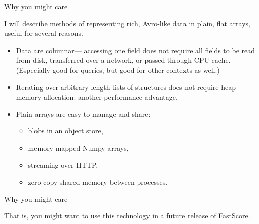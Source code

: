 \documentclass{beamer}
\begin{document}
\begin{frame}{Why you might care}
\vspace{0.5 cm}

\large
I will describe methods of representing rich, Avro-like data in plain, flat arrays, useful for several reasons.

\vspace{0.1 cm}
\begin{itemize}\setlength{\itemsep}{0.2 cm}
\item<2-> Data are columnar--- accessing one field does not require all fields to be read from disk, transferred over a network, or passed through CPU cache. (Especially good for queries, but good for other contexts as well.)
\item<3-> Iterating over arbitrary length lists of structures does not require heap memory allocation: another performance advantage.
\item<4-> Plain arrays are easy to manage and share:
\begin{itemize}
\item blobs in an object store,
\item memory-mapped Numpy arrays,
\item streaming over HTTP,
\item zero-copy shared memory between processes.
\end{itemize}
\end{itemize}
\end{frame}

\begin{frame}{Why you might care}
\Large
\begin{center}
That is, you might want to use this technology in a future release of FastScore.
\end{center}
\end{frame}
\end{document}
